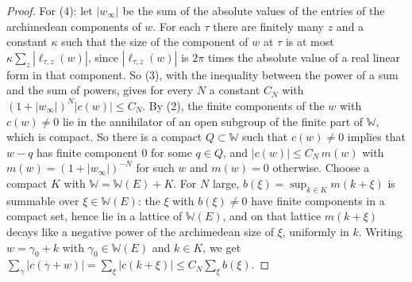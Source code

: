 \begin{proof}
For (4): let $|w_\infty|$ be the sum of the absolute values of the entries of
the archimedean components of $w$. For each $\tau$ there are finitely many $z$
and a constant $\kappa$ such that the size of the component of $w$ at $\tau$ is
at most $\kappa\sum_z|\ell_{\tau,z}(w)|$, since $|\ell_{\tau,z}(w)|$ is $2\pi$
times the absolute value of a real linear form in that component. So (3), with
the inequality between the power of a sum and the sum of powers, gives for
every $N$ a constant $C_N$ with $(1+|w_\infty|)^N|c(w)|\leq C_N$. By (2), the
finite components of the $w$ with $c(w)\neq0$ lie in the annihilator of an open
subgroup of the finite part of $\mathbb W$, which is compact. So there is a
compact $Q\subset\mathbb W$ such that $c(w)\neq0$ implies that $w-q$ has finite
component $0$ for some $q\in Q$, and
$|c(w)|\leq C_N\,m(w)$ with $m(w)=(1+|w_\infty|)^{-N}$ for such $w$ and
$m(w)=0$ otherwise. Choose a compact $K$ with $\mathbb W=\mathbb W(E)+K$. For
$N$ large, $b(\xi)=\sup_{k\in K}m(k+\xi)$ is summable over
$\xi\in\mathbb W(E)$: the $\xi$ with $b(\xi)\neq0$ have finite components in a
compact set, hence lie in a lattice of $\mathbb W(E)$, and on that lattice
$m(k+\xi)$ decays like a negative power of the archimedean size of $\xi$,
uniformly in $k$. Writing $w=\gamma_0+k$ with $\gamma_0\in\mathbb W(E)$ and
$k\in K$, we get
$\sum_\gamma|c(\gamma+w)|=\sum_\xi|c(k+\xi)|\leq C_N\sum_\xi b(\xi)$.
\end{proof}

